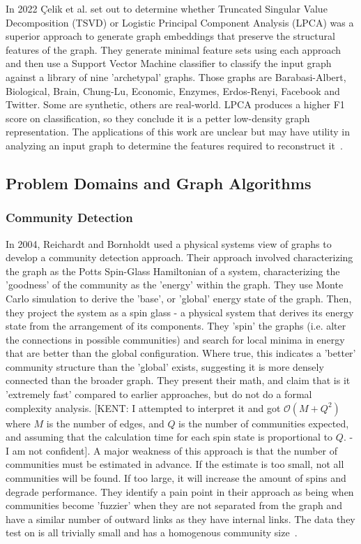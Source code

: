  \par{In 2022 {\c{C}}elik et al. set out to determine whether Truncated Singular Value Decomposition (TSVD) or Logistic Principal Component Analysis (LPCA) was a superior approach to generate graph embeddings that preserve the structural features of the graph. They generate minimal feature sets using each approach and then use a Support Vector Machine classifier to classify the input graph against a library of nine 'archetypal' graphs. Those graphs are Barabasi-Albert, Biological, Brain, Chung-Lu, Economic, Enzymes, Erdos-Renyi, Facebook and Twitter. Some are synthetic, others are real-world. LPCA produces a higher F1 score on classification, so they conclude it is a petter low-density graph representation. The applications of this work are unclear but may have utility in analyzing an input graph to determine the features required to reconstruct it~\cite{Celik2022}. }


\subsection{Problem Domains and Graph Algorithms}

\subsubsection{Community Detection}

\par{In 2004, Reichardt and Bornholdt used a physical systems view of graphs to develop a community detection approach. 
 Their approach involved characterizing the graph as the Potts Spin-Glass Hamiltonian of a system, characterizing the 'goodness' of the community as the 'energy' within the graph. 
 They use Monte Carlo simulation to derive the 'base', or 'global' energy state of the graph. 
 Then, they project the system as a spin glass - a physical system that derives its energy state from the arrangement of its components. 
 They 'spin' the graphs (i.e. alter the connections in possible communities) and search for local minima in energy that are better than the global configuration. 
 Where true, this indicates a 'better' community structure than the 'global' exists, suggesting it is more densely connected than the broader graph.
  They present their math, and claim that is it 'extremely fast' compared to earlier approaches, but do not do a formal complexity analysis. [KENT: I attempted to interpret it and got $\mathcal{O}(M+Q^2)$ where $M$ is the number of edges, and $Q$ is the number of communities expected, and assuming that the calculation time for each spin state is proportional to $Q$. - I am not confident]. 
  A major weakness of this approach is that the number of communities must be estimated in advance. 
  If the estimate is too small, not all communities will be found. If too large, it will increase the amount of spins and degrade performance. 
  They identify a pain point in their approach as being when communities become 'fuzzier' when they are not separated from the graph and have a similar number of outward links as they have internal links. 
  The data they test on is all trivially small and has a homogenous community size~\cite{Reichardt2004}.}

